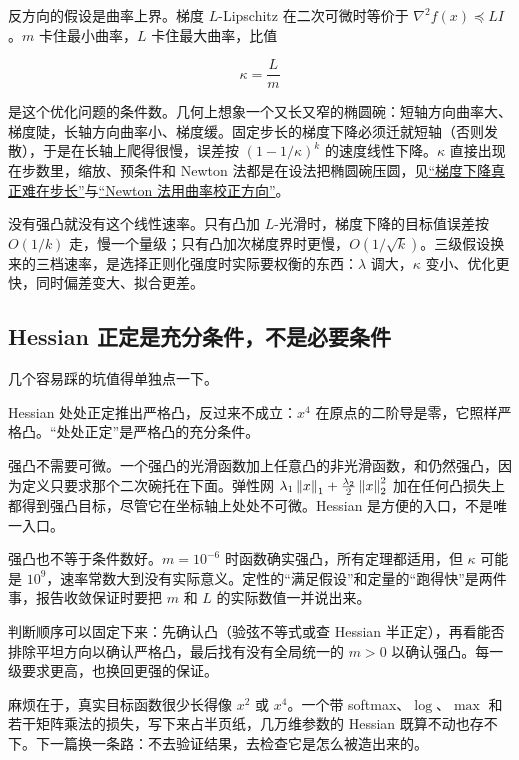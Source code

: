 反方向的假设是曲率上界。梯度 \(L\)-Lipschitz 在二次可微时等价于 \(\nabla^2f(x)\preceq LI\)。\(m\) 卡住最小曲率，\(L\) 卡住最大曲率，比值

\[
\kappa=\frac Lm
\]

是这个优化问题的条件数。几何上想象一个又长又窄的椭圆碗：短轴方向曲率大、梯度陡，长轴方向曲率小、梯度缓。固定步长的梯度下降必须迁就短轴（否则发散），于是在长轴上爬得很慢，误差按 \((1-1/\kappa)^k\) 的速度线性下降。\(\kappa\) 直接出现在步数里，缩放、预条件和 Newton 法都是在设法把椭圆碗压圆，见\hyperref[sec:09-Convex-Optimization/06-Optimization-Algorithms/01]{``梯度下降真正难在步长''}与\hyperref[sec:09-Convex-Optimization/06-Optimization-Algorithms/02]{``Newton 法用曲率校正方向''}。

没有强凸就没有这个线性速率。只有凸加 \(L\)-光滑时，梯度下降的目标值误差按 \(O(1/k)\) 走，慢一个量级；只有凸加次梯度界时更慢，\(O(1/\sqrt k)\)。三级假设换来的三档速率，是选择正则化强度时实际要权衡的东西：\(\lambda\) 调大，\(\kappa\) 变小、优化更快，同时偏差变大、拟合更差。

\subsection{Hessian 正定是充分条件，不是必要条件}

几个容易踩的坑值得单独点一下。

Hessian 处处正定推出严格凸，反过来不成立：\(x^4\) 在原点的二阶导是零，它照样严格凸。``处处正定''是严格凸的充分条件。

强凸不需要可微。一个强凸的光滑函数加上任意凸的非光滑函数，和仍然强凸，因为定义只要求那个二次碗托在下面。弹性网 \(\lambda_1\left\lVert x\right\rVert_1+\frac{\lambda_2}2\left\lVert x\right\rVert_2^2\) 加在任何凸损失上都得到强凸目标，尽管它在坐标轴上处处不可微。Hessian 是方便的入口，不是唯一入口。

强凸也不等于条件数好。\(m=10^{-6}\) 时函数确实强凸，所有定理都适用，但 \(\kappa\) 可能是 \(10^{9}\)，速率常数大到没有实际意义。定性的``满足假设''和定量的``跑得快''是两件事，报告收敛保证时要把 \(m\) 和 \(L\) 的实际数值一并说出来。

判断顺序可以固定下来：先确认凸（验弦不等式或查 Hessian 半正定），再看能否排除平坦方向以确认严格凸，最后找有没有全局统一的 \(m>0\) 以确认强凸。每一级要求更高，也换回更强的保证。

麻烦在于，真实目标函数很少长得像 \(x^2\) 或 \(x^4\)。一个带 softmax、\(\log\)、\(\max\) 和若干矩阵乘法的损失，写下来占半页纸，几万维参数的 Hessian 既算不动也存不下。下一篇换一条路：不去验证结果，去检查它是怎么被造出来的。
